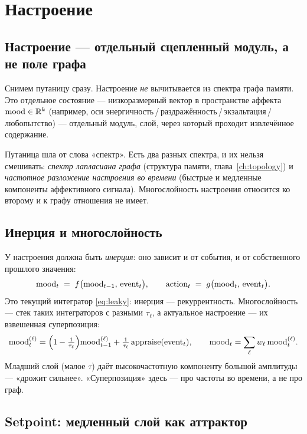 \chapter{Настроение}
\label{ch:mood}

\section{Настроение — отдельный сцепленный модуль, а не поле графа}

Снимем путаницу сразу. Настроение \emph{не} вычитывается из спектра графа памяти.
Это отдельное состояние — низкоразмерный вектор в пространстве аффекта
$\mathrm{mood}\in\mathbb{R}^k$ (например, оси
энергичность\,/\,раздражённость\,/\,экзальтация\,/\,любопытство) — отдельный модуль,
слой, через который проходит извлечённое содержание.

Путаница шла от слова «спектр». Есть два разных спектра, и их нельзя смешивать:
\emph{спектр лапласиана графа} (структура памяти, глава~\ref{ch:topology}) и
\emph{частотное разложение настроения во времени} (быстрые и медленные компоненты
аффективного сигнала). Многослойность настроения относится ко второму и к графу
отношения не имеет.

\section{Инерция и многослойность}

У настроения должна быть \emph{инерция}: оно зависит и от события, и от собственного
прошлого значения:
\begin{equation}
\mathrm{mood}_t \;=\; f\big(\mathrm{mood}_{t-1},\,\text{event}_t\big),\qquad
\text{action}_t \;=\; g\big(\mathrm{mood}_t,\,\text{event}_t\big).
\label{eq:moodinertia}
\end{equation}
Это текущий интегратор \eqref{eq:leaky}: инерция — рекуррентность. Многослойность —
стек таких интеграторов с разными $\tau_\ell$, а актуальное настроение — их
взвешенная суперпозиция:
\begin{equation}
\mathrm{mood}^{(\ell)}_t=\Big(1-\tfrac{1}{\tau_\ell}\Big)\mathrm{mood}^{(\ell)}_{t-1}+\tfrac{1}{\tau_\ell}\,\text{appraise}(\text{event}_t),
\qquad
\mathrm{mood}_t=\sum_\ell w_\ell\,\mathrm{mood}^{(\ell)}_t .
\end{equation}
Младший слой (малое $\tau$) даёт высокочастотную компоненту большой амплитуды —
«дрожит сильнее». «Суперпозиция» здесь — про частоты во времени, а не про граф.

\section{Setpoint: медленный слой как аттрактор}

